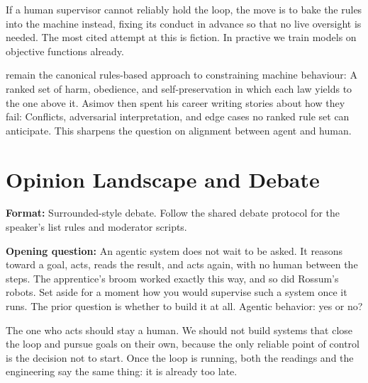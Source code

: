 \noindent If a human supervisor cannot reliably hold the loop, the
move is to bake the rules into the machine instead, fixing its
conduct in advance so that no live oversight is needed. The most cited
attempt at this is fiction. In practive we train models on objective functions already.



\cite{asimov1950robot} remain the canonical
rules-based approach to constraining machine behaviour: A ranked set of
harm, obedience, and self-preservation in which each law yields to the one
above it. Asimov then spent his career writing stories about how they fail:
Conflicts, adversarial interpretation, and edge cases no ranked rule set
can anticipate. This sharpens the question on alignment between agent and human.









\newpage


\section*{Opinion Landscape and Debate}

\noindent \textbf{Format:} Surrounded-style debate. Follow the shared
debate protocol for the speaker's list rules and moderator scripts.

\medskip
\noindent \textbf{Opening question:} An agentic system does not wait to be
asked. It reasons toward a goal, acts, reads the result, and acts again, with
no human between the steps. The apprentice's broom worked exactly this way,
and so did Rossum's robots. Set aside for a moment how you would supervise
such a system once it runs. The prior question is whether to build it at all.
Agentic behavior: yes or no?

\quad The one who acts should stay a human. We
should not build systems that close the loop and pursue goals on their own,
because the only reliable point of control is the decision not to start. Once
the loop is running, both the readings and the engineering say the same
thing: it is already too late.
\vspace{1.5em}

